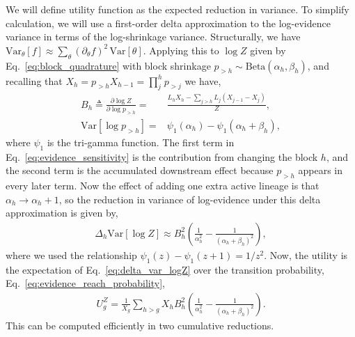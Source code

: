 \documentclass[pdflatex,sn-basic,icol]{sn-jnl}
\newcommand{\Beta}{\mathrm{Beta}}
\theoremstyle{plain}
\theoremstyle{definition}
\begin{document}
\begin{appendices}
We will define utility function as the expected reduction in variance.
To simplify calculation, we will use a first-order delta approximation to the log-evidence variance in terms of the log-shrinkage variance.
Structurally, we have $\mathrm{Var}_\theta[f] \approx \sum_\theta (\partial_\theta f)^2\, \mathrm{Var}[\theta]$.
Applying this to $\log Z$ given by Eq.~\ref{eq:block_quadrature} with block shrinkage $p_{>h} \sim \Beta(\alpha_h, \beta_h)$, and recalling that $X_h = p_{>h} X_{h-1} = \prod_j^h p_{>j}$ we have,
\begin{align}
    B_h \triangleq \frac{\partial \log Z}{\partial \log p_{>h}}
    =&
    \frac{
    L_h X_h
    -\sum_{j > h} L_j( X_{j-1}- X_j)
    }{ Z},\label{eq:evidence_sensitivity}\\
    \mathrm{Var}[\log p_{>h}] =& \psi_1(\alpha_h) - \psi_1(\alpha_h + \beta_h),
\end{align}
where $\psi_1$ is the tri-gamma function.
The first term in Eq.~\ref{eq:evidence_sensitivity} is the contribution from changing the block $h$, and the second term is the accumulated downstream effect because $p_{>h}$ appears in every later term.
Now the effect of adding one extra active lineage is that $\alpha_h \to \alpha_h + 1$, so the reduction in variance of log-evidence under this delta approximation is given by,
\begin{align}
    \Delta_h \mathrm{Var}[\log Z] \approx B_h^2 \left(\frac{1}{\alpha_h^2} - \frac{1}{(\alpha_h + \beta_h)^2}\right),\label{eq:delta_var_logZ}
\end{align}
where we used the relationship $\psi_1(z) - \psi_1(z + 1) = 1/z^2$.
Now, the utility is the expectation of Eq.~\ref{eq:delta_var_logZ} over the transition probability, Eq.~\ref{eq:evidence_reach_probability},
\begin{align}
    U^Z_g = \frac{1}{X_g}\sum_{h > g} X_h B_h^2 \left(\frac{1}{\alpha_h^2} - \frac{1}{(\alpha_h + \beta_h)^2}\right).\label{eq:evidence_improving_utility}
\end{align}
This can be computed efficiently in two cumulative reductions.


\end{appendices}
\end{document}
